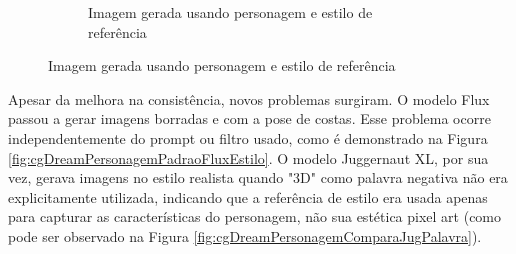 \begin{figure}[htbp]
\begin{subfigure}{0.45\linewidth}
        \caption{\small Imagem gerada usando personagem e estilo de referência}
        \label{fig:cgDreamJugComEstilo}
    \end{subfigure}
\end{figure}

Apesar da melhora na consistência, novos problemas surgiram. O modelo Flux passou a gerar imagens borradas e com a pose de costas. Esse problema ocorre independentemente do prompt ou filtro usado, como é demonstrado na Figura \ref{fig:cgDreamPersonagemPadraoFluxEstilo}. O modelo Juggernaut XL, por sua vez, gerava imagens no estilo realista quando "3D" como palavra negativa não era explicitamente utilizada, indicando que a referência de estilo era usada apenas para capturar as características do personagem, não sua estética pixel art (como pode ser observado na Figura \ref{fig:cgDreamPersonagemComparaJugPalavra}).

